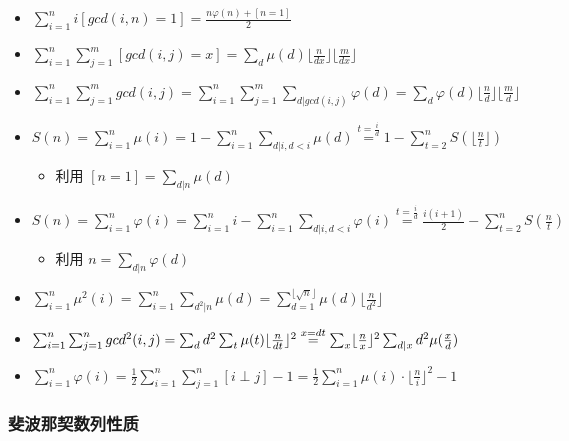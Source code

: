 \documentclass[]{article}
\providecommand{\tightlist}{%
  \setlength{\itemsep}{0pt}\setlength{\parskip}{0pt}}
\begin{document}
\begin{itemize}
\tightlist
\item
  \(\sum_{i=1}^n i[gcd(i, n)=1] = \frac {n \varphi(n) + [n=1]}{2}\)
\item
  \(\sum_{i=1}^n \sum_{j=1}^m [gcd(i,j)=x]=\sum_d \mu(d) \lfloor \frac n {dx} \rfloor \lfloor \frac m {dx} \rfloor\)
\item
  \(\sum_{i=1}^n \sum_{j=1}^m gcd(i, j) = \sum_{i=1}^n \sum_{j=1}^m \sum_{d|gcd(i,j)} \varphi(d) = \sum_{d} \varphi(d) \lfloor \frac nd \rfloor \lfloor \frac md \rfloor\)
\item
  \(S(n)=\sum_{i=1}^n \mu(i)=1-\sum_{i=1}^n \sum_{d|i,d < i}\mu(d) \overset{t=\frac id}{=} 1-\sum_{t=2}^nS(\lfloor \frac nt \rfloor)\)

  \begin{itemize}
  \tightlist
  \item
    利用 \([n=1] = \sum_{d|n} \mu(d)\)
  \end{itemize}
\item
  \(S(n)=\sum_{i=1}^n \varphi(i)=\sum_{i=1}^n i-\sum_{i=1}^n \sum_{d|i,d<i} \varphi(i)\overset{t=\frac id}{=} \frac {i(i+1)}{2} - \sum_{t=2}^n S(\frac n t)\)

  \begin{itemize}
  \tightlist
  \item
    利用 \(n = \sum_{d|n} \varphi(d)\)
  \end{itemize}
\item
  \(\sum_{i=1}^n \mu^2(i) = \sum_{i=1}^n \sum_{d^2|n} \mu(d)=\sum_{d=1}^{\lfloor \sqrt n \rfloor}\mu(d) \lfloor \frac n {d^2} \rfloor\)
\item
  \(\sum_{i=1}^n \sum_{j=1}^n gcd^2(i, j)= \sum_{d} d^2 \sum_{t} \mu(t) \lfloor \frac n{dt} \rfloor ^2 \\ \overset{x=dt}{=} \sum_{x} \lfloor \frac nx \rfloor ^ 2 \sum_{d|x} d^2 \mu(\frac xd)\)
\item
  \(\sum_{i=1}^n \varphi(i)=\frac 12 \sum_{i=1}^n \sum_{j=1}^n [i \perp j] - 1=\frac 12 \sum_{i=1}^n \mu(i) \cdot\lfloor \frac n i \rfloor ^2-1\)
\end{itemize}

\hypertarget{ux6590ux6ce2ux90a3ux5951ux6570ux5217ux6027ux8d28}{%
\subsubsection{斐波那契数列性质}\label{ux6590ux6ce2ux90a3ux5951ux6570ux5217ux6027ux8d28}}
\end{document}

